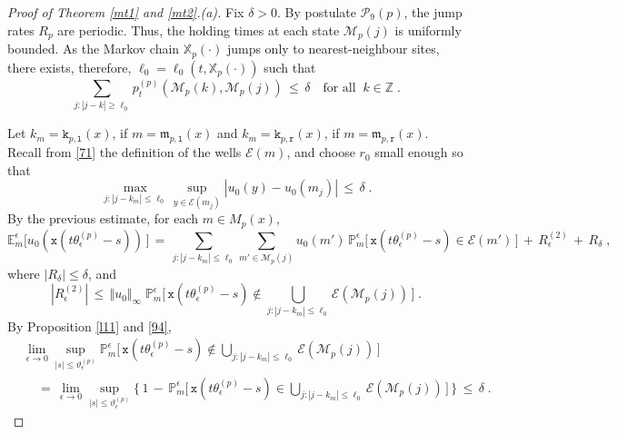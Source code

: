 \documentclass[reqno]{amsart}
\theoremstyle{plain}
\theoremstyle{definition}
\newcommand{\mc}[1]{{\mathcal #1}}
\newcommand{\mf}[1]{{\mathfrak #1}}
\newcommand{\bb}[1]{{\mathbb #1}}
\newcommand{\ms}[1]{{\mathscr #1}}
\newcommand{\mtt}[1]{{\mathtt #1}}
\newcommand{\<}{\langle}
\renewcommand{\>}{\rangle}
\begin{document}
\begin{proof}[Proof of Theorem \ref{mt1} and \ref{mt2}.{\rm (a)}]
Fix $\delta>0$.  By postulate $\mc P_9(p)$, the jump rates $R_p$ are
periodic. Thus, the holding times at each state $\ms M_p(j)$ is
uniformly bounded. As the Markov chain $\bb X_p(\cdot)$ jumps only to
nearest-neighbour sites, there exists, therefore,
$\ell_0 = \ell_0(t, \bb X_p(\cdot))$ such that
\begin{equation}
\label{94}
\sum_{j: |j-k|\ge \ell_0} p^{(p)}_t (\ms M_p(k), \ms M_p(j))
\,\le\,\delta \quad \text{for all}\;\; k\in\bb Z \;. 
\end{equation}

Let $k_m = \mtt k_{p,\mtt l}(x)$, if $m= \mf m_{p,\mtt l}(x)$ and
$k_m = \mtt k_{p,\mtt r}(x)$, if $m= \mf m_{p,\mtt r}(x)$.  Recall
from \eqref{71} the definition of the wells $\ms E(m)$, and choose
$r_0$ small enough so that
\begin{equation*}
\max_{j: |j-k_m|\le \ell_0}\sup_{y\in\ms E(m_j)} |u_0(y) -
u_0(m_j)| \,\le\, \delta \;.
\end{equation*}
By the previous estimate, for each $m\in M_p(x)$,
\begin{equation*}
\bb E^{\epsilon}_{m} \big[ u_0( \mtt x(t\theta^{(p)}_\epsilon - s))
\,\big] 
\,=\, \sum_{j: |j-k_m|\le \ell_0} \sum_{m'\in \ms M_p(j)} u_0(m')\, 
\bb P^{\epsilon}_m\big[ \, 
\mtt x(t\theta^{(p)}_\epsilon - s) \in \ms E(m') \, \big]
\,+\, R^{(2)}_\epsilon \,+\, R_\delta \;,
\end{equation*}
where $|R_\delta| \le \delta$, and 
\begin{equation*}
|R^{(2)}_\epsilon| \,\le\, \Vert u_0\Vert_\infty\;
\bb P^{\epsilon}_m\Big[ \, 
\mtt x(t\theta^{(p)}_\epsilon - s) \not\in \bigcup_{j: |j-k_m| \le  \ell_0}
\ms E(\ms M_p(j)) \,\Big] \;.
\end{equation*}
By Proposition \ref{l11} and \eqref{94},
\begin{equation*}
\begin{aligned}
& \lim_{\epsilon\to 0} \sup_{|s|\le \vartheta^{(p)}_\epsilon}
\bb P^{\epsilon}_m\Big[ \, 
\mtt x(t\theta^{(p)}_\epsilon - s) \not \in \bigcup_{j: |j-k_m| \le \ell_0}
\ms E(\ms M_p(j)) \,\Big]
\\
&\quad
\,=\, \lim_{\epsilon\to 0}  \sup_{|s|\le \vartheta^{(p)}_\epsilon}
\Big\{\, 1\, -\, \bb P^{\epsilon}_m\Big[ \, 
\mtt x(t\theta^{(p)}_\epsilon - s) \in \bigcup_{j: |j-k_m| \le \ell_0}
\ms E(\ms M_p(j)) \,\Big] \,\Big\} \,\le\,\delta\;.
\end{aligned}
\end{equation*}


\end{proof}
\end{document}
